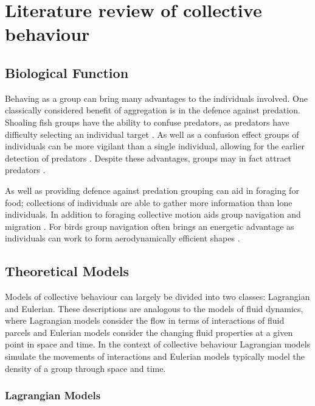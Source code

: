 \chapter{Literature review of collective behaviour}

\section{Biological Function}
\label{sec:biological_function}

Behaving as a group can bring many advantages to the individuals involved. One classically considered  benefit of aggregation is in the defence against predation. Shoaling fish groups have the ability to confuse predators, as predators have difficulty selecting an individual target \citep{landeau86}. As well as a confusion effect groups of individuals can be more vigilant than a single individual, allowing for the earlier detection of predators \citep{pitcher93}. Despite these advantages, groups may in fact attract predators \citep{wittenberger85}.

As well as providing defence against predation grouping can aid in foraging for food; collections of individuals are able to gather more information than lone individuals. In addition to foraging collective motion aids group navigation and migration \citep{simmons04}. For birds group navigation often brings an energetic advantage as individuals can work to form aerodynamically efficient shapes \citep{weimerskirch01}.

\section{Theoretical Models}
\label{sec:models}

Models of collective behaviour can largely be divided into two classes: Lagrangian and Eulerian. These descriptions are analogous to the models of fluid dynamics, where Lagrangian models consider the flow in terms of interactions of fluid parcels and Eulerian models consider the changing fluid properties at a given point in space and time. In the context of collective behaviour Lagrangian models simulate the movements of interactions and Eulerian models typically model the density of a group through space and time.

\subsection{Lagrangian Models}
\label{ssec:lagrangian_models}

